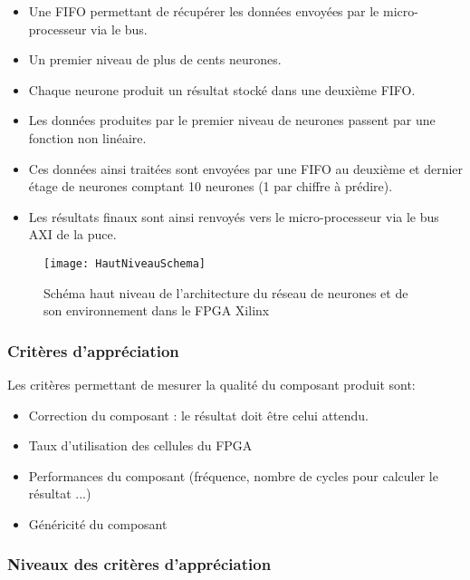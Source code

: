 \begin{itemize}
	\item Une FIFO permettant de récupérer les données envoyées par le micro-processeur via le bus.
	\item Un premier niveau de plus de cents neurones.
	\item Chaque neurone produit un résultat stocké dans une deuxième FIFO.
	\item Les données produites par le premier niveau de neurones passent par une fonction non linéaire.
	\item Ces données ainsi traitées sont envoyées par une FIFO au deuxième et dernier étage de neurones comptant 10 neurones (1 par chiffre à prédire).
	\item Les résultats finaux sont ainsi renvoyés vers le micro-processeur via le bus AXI de la puce.
\end{itemize}

\begin{figure}[htbp]
\begin{center}
\texttt{[image: HautNiveauSchema]}
\caption{Schéma haut niveau de l'architecture du réseau de neurones et de son environnement dans le FPGA Xilinx}
\label{fig:HautNiveauSchema}
\end{center}
\end{figure}

\subsubsection{Critères d’appréciation}

Les critères permettant de mesurer la qualité du composant produit sont:
\begin{itemize}
	\item Correction du composant : le résultat doit être celui attendu.
	\item Taux d'utilisation des cellules du FPGA
	\item Performances du composant (fréquence, nombre de cycles pour
		calculer le résultat ...)
	\item Généricité du composant
\end{itemize}

\subsubsection{Niveaux des critères d’appréciation}

